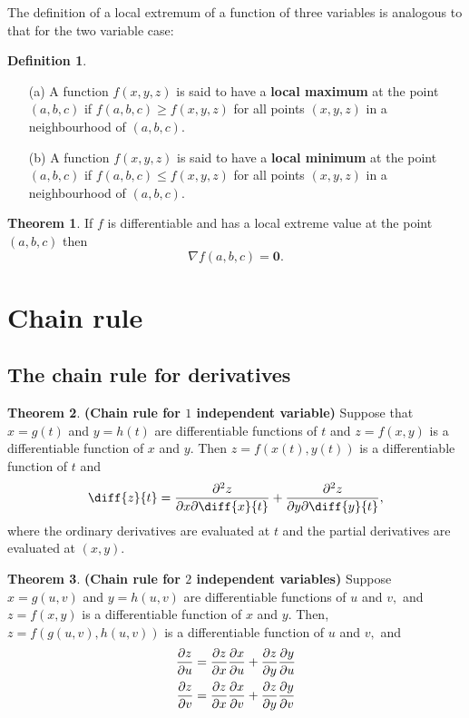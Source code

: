 \documentclass[12pt, a4paper]{article}
\newcommand{\mb}[1]{\mathbf{#1}}
\theoremstyle{definition}
\newtheorem{definition}{Definition}[section]
\newtheorem{theorem}{Theorem}[section]
\theoremstyle{plain}
\begin{document}
The definition of a local extremum of a function of three variables is analogous to that for the
two variable case:

\begin{definition}
\hphantom{This text is to make space so it looks good when finalised.} 
\begin{enumerate}
	
	\item[(a)] A function $f(x,y,z)$ is said to have a \textbf{local maximum} at the point $(a,b,c)$ if $f(a,b,c) \geq f(x,y,z)$ for all points $(x,y,z)$ in a neighbourhood of $(a,b,c).$

	\item[(b)] A function $f(x,y,z)$ is said to have a \textbf{local minimum} at the point $(a,b,c)$ if $f(a,b,c) \leq f(x,y,z)$ for all points $(x,y,z)$ in a neighbourhood of $(a,b,c).$

\end{enumerate}
\end{definition}

\begin{theorem}
If $f$ is differentiable and has a local extreme value at the point $(a, b, c)$ then $$\nabla f(a,b,c)=\mb{0}.$$
\end{theorem}

\section{Chain rule}

\subsection{The chain rule for derivatives}

\begin{theorem} \textbf{(Chain rule for $1$ independent variable)} Suppose that $x=g(t)$ and $y=h(t)$ are differentiable functions of $t$ and $z=f(x,y)$ is a differentiable function of $x$ and $y.$ Then $z=f(x(t),y(t))$ is a differentiable function of $t$ and $$\diff{z}{t}=\pdv{z}{x}\diff{x}{t}+\pdv{z}{y}\diff{y}{t},$$ where the ordinary derivatives are evaluated at $t$ and the partial derivatives are evaluated at $(x,y).$
\end{theorem}

\begin{theorem} \textbf{(Chain rule for $2$ independent variables)} Suppose $x = g(u, v)$ and $y = h(u, v)$ are differentiable functions of $u$ and $v,$ and $z = f (x, y)$ is a differentiable function of $x$ and $y.$ Then, $z = f(g(u, v), h(u, v))$ is a differentiable function of $u$ and $v,$ and $$\begin{aligned}
\pdv{z}{u} &=\pdv{z}{x}\pdv{x}{u}+\pdv{z}{y}\pdv{y}{u}\\
\pdv{z}{v}&=\pdv{z}{x}\pdv{x}{v}+\pdv{z}{y}\pdv{y}{v}
\end{aligned}$$
\end{theorem}
\end{document}
